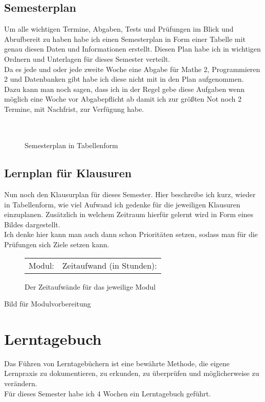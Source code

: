\documentclass[11pt]{article}
\begin{document}
\subsection{Semesterplan}
Um alle wichtigen Termine, Abgaben, Tests und Prüfungen im Blick und Abrufbereit zu haben habe ich einen Semesterplan in Form einer Tabelle mit genau diesen Daten und Informationen erstellt. Diesen Plan habe ich in wichtigen Ordnern und Unterlagen für dieses Semester verteilt. 
\\Da es jede und oder jede zweite Woche eine Abgabe für Mathe 2, Programmieren 2 und Datenbanken gibt habe ich diese nicht mit in den Plan aufgenommen. Dazu kann man noch sagen, dass ich in der Regel gebe diese Aufgaben wenn möglich eine Woche vor Abgabepflicht ab damit ich zur größten Not noch 2 Termine, mit Nachfrist, zur Verfügung habe. 
\\\\
\begin{figure}
\begin{tabular}{}

\end{tabular}
\caption{Semesterplan in Tabellenform}
\end{figure}


\newpage

\subsection{Lernplan für Klausuren}
Nun noch den Klausurplan für dieses Semester. Hier beschreibe ich kurz, wieder in Tabellenform, wie viel Aufwand ich gedenke für die jeweiligen Klausuren einzuplanen. Zusätzlich in welchem Zeitraum hierfür gelernt wird in Form eines Bildes dargestellt. 
\\
Ich denke hier kann man auch dann schon Prioritäten setzen, sodass man für die Prüfungen sich Ziele setzen kann. 
\begin{figure}
\begin{tabular}{|l|l|}
\hline
Modul: & Zeitaufwand (in Stunden): \\
\end{tabular}
\caption{Der Zeitaufwände für das jeweilige Modul}
\end{figure}

Bild für Modulvorbereitung


\newpage


\section{Lerntagebuch}
Das Führen von Lerntagebüchern ist eine bewährte Methode, die eigene Lernpraxis zu dokumentieren, zu erkunden, zu überprüfen und möglicherweise zu verändern. \\
Für dieses Semester habe ich 4 Wochen ein Lerntagebuch geführt.
\end{document}
